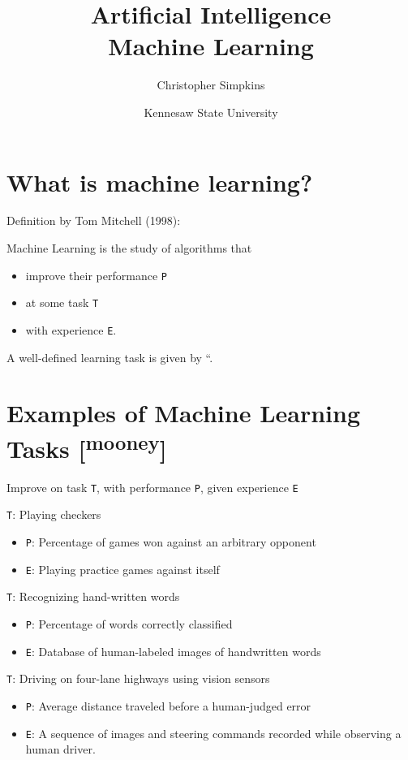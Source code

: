 \documentclass[11pt]{article}
\author{Christopher Simpkins}
\date{Kennesaw State University}
\title{Artificial Intelligence\\\medskip
\large Machine Learning}
\begin{document}
\maketitle
\section{What is machine learning?}
\label{sec:orgbd3903f}

Definition by Tom Mitchell (1998):

Machine Learning is the study of algorithms that

\begin{itemize}
\item improve their performance \texttt{P}
\item at some task \texttt{T}
\item with experience \texttt{E}.
\end{itemize}

A well-defined learning task is given by ``.
\section{Examples of Machine Learning Tasks [\textsuperscript{mooney}]}
\label{sec:orgfa10237}

Improve on task \texttt{T}, with performance \texttt{P}, given experience \texttt{E}

\texttt{T}: Playing checkers

\begin{itemize}
\item \texttt{P}: Percentage of games won against an arbitrary opponent
\item \texttt{E}: Playing practice games against itself
\end{itemize}

\texttt{T}: Recognizing hand-written words

\begin{itemize}
\item \texttt{P}: Percentage of words correctly classified
\item \texttt{E}: Database of human-labeled images of handwritten words
\end{itemize}

\texttt{T}: Driving on four-lane highways using vision sensors

\begin{itemize}
\item \texttt{P}: Average distance traveled before a human-judged error
\item \texttt{E}: A sequence of images and steering commands recorded while observing a human driver.
\end{itemize}
\end{document}

